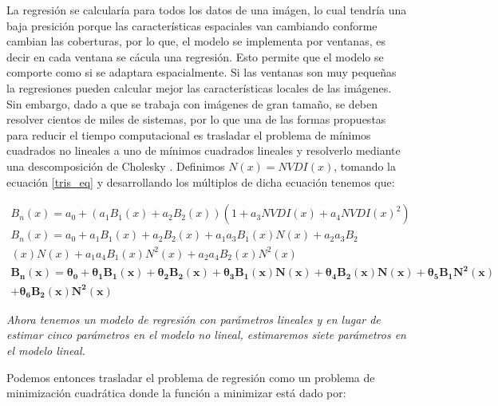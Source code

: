 La regresión se calcularía para todos los datos de una imágen, lo cual tendría una baja presición porque las características espaciales van cambiando conforme cambian las coberturas, por lo que, el modelo se implementa por ventanas, es decir en cada ventana se cácula una regresión. Esto permite que el modelo se comporte como si se adaptara espacialmente. Si las ventanas son muy pequeñas la regresiones pueden calcular mejor las características locales de las imágenes. Sin  embargo, dado a que se trabaja con imágenes de gran tamaño, se deben resolver cientos de miles de sistemas, por lo que una de las formas propuestas para reducir el tiempo computacional es trasladar el problema de mínimos cuadrados no lineales a uno de mínimos cuadrados lineales y resolverlo mediante una descomposición de Cholesky . Definimos $N(x) = NVDI(x)$, tomando la ecuación \ref{tris_eq} y desarrollando los múltiplos de dicha ecuación tenemos que:

\begin{equation}
\begin{split}
B_{n}(x) = a_{0} + (a_{1}B_{1}(x) + a_{2}B_{2}(x))(1 + a_{3}NVDI(x) + a_{4}NVDI(x)^{2})\\
B_{n}(x) = a_{0} + a_{1}B_{1}(x) + a_{2}B_{2}(x) + a_{1}a_{3}B_{1}(x)N(x) + a_{2}a_{3}B_{2}\\(x)N(x) + a_{1}a_{4}B_{1}(x)N^{2}(x) + a_{2}a_{4}B_{2}(x)N^{2}(x)\\
\mathbf{B_{n}(x) =  \theta_{0} + \theta_{1}B_{1}(x) + \theta_{2}B_{2}(x) + \theta_{3}B_{1}(x)N(x) + \theta_{4}B_{2}(x)N(x) + \theta_{5}B_{1}N^{2}(x)}\\
\mathbf{ + \theta_{6}B_{2}(x)N^{2}(x)} 
\end{split}
\end{equation}

\textit{Ahora tenemos un modelo de regresión con parámetros lineales y en lugar de estimar cinco parámetros en el modelo no lineal, estimaremos siete parámetros en el modelo lineal.}

Podemos entonces trasladar el problema de regresión como un problema de minimización cuadrática donde la función a minimizar está dado por: 

